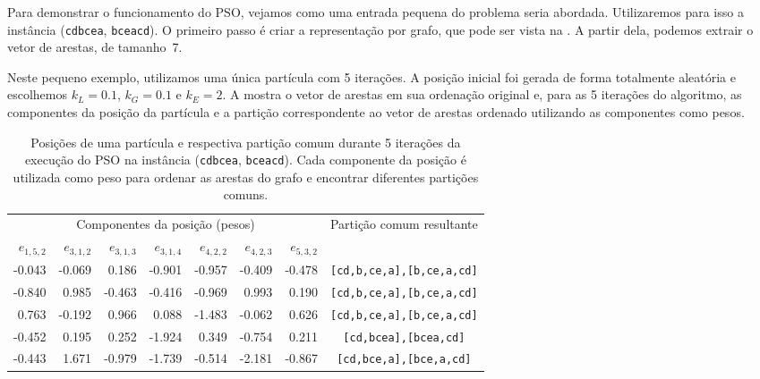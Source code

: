     Para demonstrar o funcionamento do PSO, vejamos como uma entrada pequena do problema seria abordada. Utilizaremos para isso a instância (\texttt{cdbcea}, \texttt{bceacd}). O primeiro passo é criar a representação por grafo, que pode ser vista na . A partir dela, podemos extrair o vetor de arestas, de tamanho~7.

    Neste pequeno exemplo, utilizamos uma única partícula com 5 iterações. A posição inicial foi gerada de forma totalmente aleatória e escolhemos $k_L = 0.1$, $k_G = 0.1$ e $k_E = 2$. A  mostra o vetor de arestas em sua ordenação original e, para as 5 iterações do algoritmo, as componentes da posição da partícula e a partição correspondente ao vetor de arestas ordenado utilizando as componentes como pesos.

    \begin{table}[htb]
        \centering
        \begin{tabular}{rrrrrrr|c}
            \toprule
            \multicolumn{7}{c|}{Componentes da posição (pesos)} & \multirow{2}{*}{Partição comum resultante} \\
            $e_{1,5,2}$ & $e_{3,1,2}$ & $e_{3,1,3}$ & $e_{3,1,4}$ & $e_{4,2,2}$ & $e_{4,2,3}$ & $e_{5,3,2}$ & \\
            \midrule
            -0.043 & -0.069 & 0.186 & -0.901 & -0.957 & -0.409 & -0.478 & \texttt{[cd,b,ce,a],[b,ce,a,cd]} \\
            -0.840 & 0.985 & -0.463 & -0.416 & -0.969 & 0.993 & 0.190 & \texttt{[cd,b,ce,a],[b,ce,a,cd]} \\
            0.763 & -0.192 & 0.966 & 0.088 & -1.483 & -0.062 & 0.626 & \texttt{[cd,b,ce,a],[b,ce,a,cd]} \\
            -0.452 & 0.195 & 0.252 & -1.924 & 0.349 & -0.754 & 0.211 & \texttt{[cd,bcea],[bcea,cd]} \\
            -0.443 & 1.671 & -0.979 & -1.739 & -0.514 & -2.181 & -0.867 & \texttt{[cd,bce,a],[bce,a,cd]} \\
            \bottomrule
        \end{tabular}

        \caption{Posições de uma partícula e respectiva partição comum durante 5 iterações da execução do PSO na instância (\texttt{cdbcea}, \texttt{bceacd}). Cada componente da posição é utilizada como peso para ordenar as arestas do grafo e encontrar diferentes partições comuns.}
        \label{tab:pso-ex}
    \end{table}

